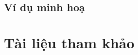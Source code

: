 \documentclass{article}
\begin{document}
    \subsection{Ví dụ minh hoạ}

\section{Tài liệu tham khảo}



\end{document}
